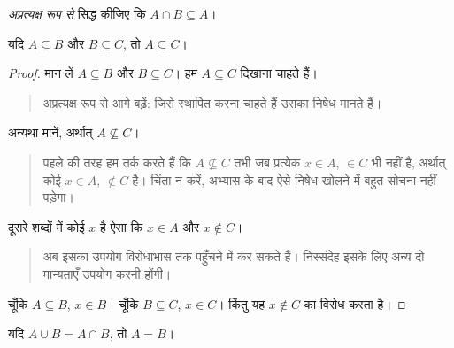 \documentclass[../../../include/open-logic-section]{subfiles}
\begin{document}
\begin{prob}
\emph{अप्रत्यक्ष रूप से} सिद्ध कीजिए कि $A\cap B\subseteq A$।
\end{prob}

\begin{prop}
यदि $A\subseteq B$ और $B\subseteq C$, तो $A\subseteq C$।
\end{prop}

\begin{proof}
  मान लें $A\subseteq B$ और $B\subseteq C$। हम $A\subseteq C$ दिखाना
  चाहते हैं।
  \begin{quote}
    अप्रत्यक्ष रूप से आगे बढ़ें: जिसे स्थापित करना चाहते हैं उसका निषेध
    मानते हैं।
  \end{quote}
  अन्यथा मानें, अर्थात् $A\nsubseteq C$।
  \begin{quote}
    पहले की तरह हम तर्क करते हैं कि $A\nsubseteq C$ तभी जब प्रत्येक
    $x\in A$, $\in C$ भी नहीं है, अर्थात् कोई $x\in A$, $\notin C$ है।
    चिंता न करें, अभ्यास के बाद ऐसे निषेध खोलने में बहुत सोचना नहीं पड़ेगा।
  \end{quote}
  दूसरे शब्दों में कोई $x$ है ऐसा कि $x\in A$ और $x\notin C$।
  \begin{quote}
    अब इसका उपयोग विरोधाभास तक पहुँचने में कर सकते हैं। निस्संदेह इसके लिए
    अन्य दो मान्यताएँ उपयोग करनी होंगी।
  \end{quote}
  चूँकि $A\subseteq B$, $x\in B$। चूँकि $B\subseteq C$, $x\in C$। किंतु
  यह $x\notin C$ का विरोध करता है।
\end{proof}

\begin{prop}
यदि $A\cup B=A\cap B$, तो $A=B$।
\end{prop}
\end{document}
